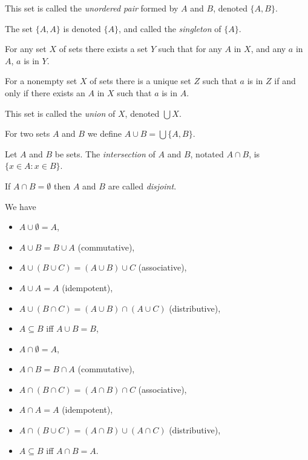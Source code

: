 \begin{defn}
  This set is called the \emph{unordered pair} formed by $A$ and $B$, denoted
  $\{A,B\}$.
\end{defn}
\begin{defn}
  The set $\{A,A\}$ is denoted $\{A\}$, and called the \emph{singleton} of
  $\{A\}$.
\end{defn}
\begin{axiom}[Union]
  For any set $X$ of sets there exists a set $Y$ such that for any $A$ in $X$,
  and any $a$ in $A$, $a$ is in $Y$.
\end{axiom}
\begin{prop}
  For a nonempty set $X$ of sets there is a unique set $Z$ such that $a$ is in $Z$ if and
  only if there exists an $A$ in $X$ such that $a$ is in $A$.
\end{prop}
\begin{defn}
  This set is called the \emph{union} of $X$, denoted
  $\bigcup X$.

  For two sets $A$ and $B$ we define $A\cup B=\bigcup \{A,B\}$.
\end{defn}
\begin{defn}
  Let $A$ and $B$ be sets.
  The \emph{intersection} of $A$ and $B$, notated $A\cap B$, is $\{x\in A:x\in
    B\}$.

  If $A\cap B=\emptyset$ then $A$ and $B$ are called \emph{disjoint}.
\end{defn}
\begin{prop}
  We have
  \begin{itemize}
    \item $A\cup\emptyset=A$,
    \item $A\cup B=B\cup A$ (commutative),
    \item $A\cup (B\cup C)=(A\cup B)\cup C$ (associative),
    \item $A\cup A=A$ (idempotent),
    \item $A\cup (B\cap C)=(A\cup B)\cap(A\cup C)$ (distributive),
    \item $A\subseteq B$ iff $A\cup B=B$,
    \item $A\cap\emptyset=A$,
    \item $A\cap B=B\cap A$ (commutative),
    \item $A\cap (B\cap C)=(A\cap B)\cap C$ (associative),
    \item $A\cap A=A$ (idempotent),
    \item $A\cap (B\cup C)=(A\cap B)\cup(A\cap C)$ (distributive),
    \item $A\subseteq B$ iff $A\cap B=A$.
  \end{itemize}
\end{prop}
